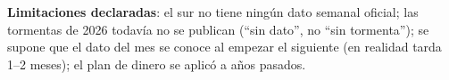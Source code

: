 \textbf{Limitaciones declaradas}: el sur no tiene ningún dato semanal oficial; las tormentas de 2026 todavía no se publican
(``sin dato'', no ``sin tormenta''); se supone que el dato del mes se conoce al empezar el siguiente (en realidad tarda 1–2
meses); el plan de dinero se aplicó a años pasados.
